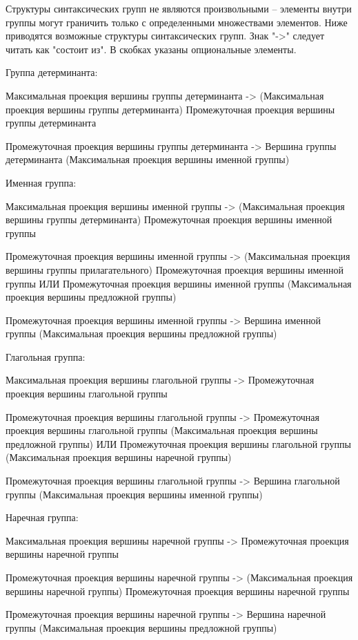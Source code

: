 Структуры синтаксических групп не являются произвольными -- элементы внутри группы могут граничить только с определенными множествами элементов.
Ниже приводятся возможные структуры синтаксических групп.
Знак "->"{} следует читать как "состоит из"{}.
В скобках указаны опциональные элементы.

Группа детерминанта:
\begin{textitemize}
    \item Максимальная проекция вершины группы детерминанта -> (Максимальная проекция вершины группы детерминанта) Промежуточная проекция вершины группы детерминанта
    \item Промежуточная проекция вершины группы детерминанта -> Вершина группы детерминанта (Максимальная проекция вершины именной группы)
\end{textitemize}

Именная группа:
\begin{textitemize}
    \item Максимальная проекция вершины именной группы -> (Максимальная проекция вершины группы детерминанта) Промежуточная проекция вершины именной группы
    \item Промежуточная проекция вершины именной группы -> (Максимальная проекция вершины группы прилагательного) Промежуточная проекция вершины именной группы ИЛИ Промежуточная проекция вершины именной группы (Максимальная проекция вершины предложной группы)
    \item Промежуточная проекция вершины именной группы -> Вершина именной группы (Максимальная проекция вершины предложной группы)
\end{textitemize}

Глагольная группа:
\begin{textitemize}
    \item Максимальная проекция вершины глагольной группы -> Промежуточная проекция вершины глагольной группы
    \item Промежуточная проекция вершины глагольной группы -> Промежуточная проекция вершины глагольной группы (Максимальная проекция вершины предложной группы) ИЛИ Промежуточная проекция вершины глагольной группы (Максимальная проекция вершины наречной группы)
    \item Промежуточная проекция вершины глагольной группы -> Вершина глагольной группы (Максимальная проекция вершины именной группы)
\end{textitemize}

Наречная группа:
\begin{textitemize}
    \item Максимальная проекция вершины наречной группы -> Промежуточная проекция вершины наречной группы
    \item Промежуточная проекция вершины наречной группы -> (Максимальная проекция вершины наречной группы) Промежуточная проекция вершины наречной группы
    \item Промежуточная проекция вершины наречной группы -> Вершина наречной группы (Максимальная проекция вершины предложной группы)
\end{textitemize}

